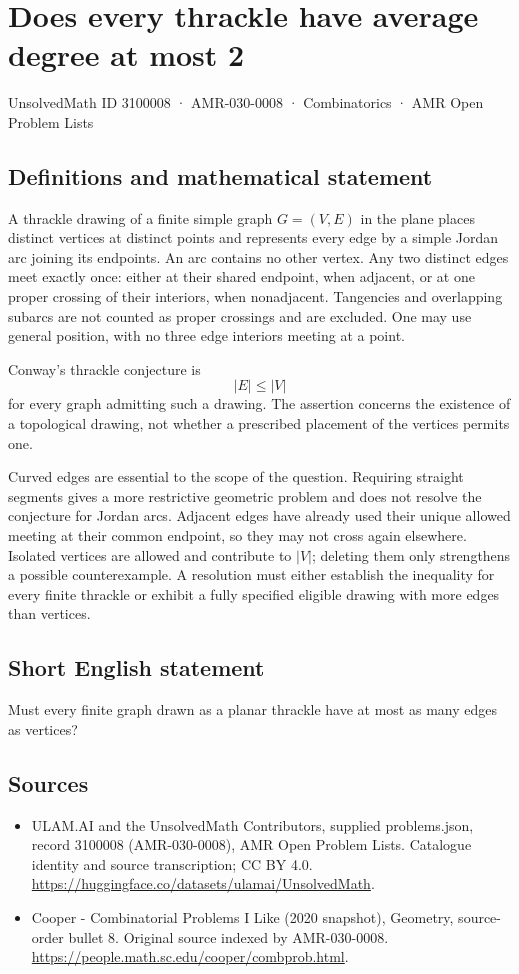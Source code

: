 \documentclass[11pt,a4paper]{article}
\begin{document}
\section*{Does every thrackle have average degree at most 2}\label{3100008}
{\small UnsolvedMath ID 3100008 · AMR-030-0008 · Combinatorics · AMR Open Problem Lists}
\subsection{Definitions and mathematical statement}
A thrackle drawing of a finite simple graph $G=(V,E)$ in the plane
places distinct vertices at distinct points and represents every
edge by a simple Jordan arc joining its endpoints. An arc contains
no other vertex. Any two distinct edges meet exactly once: either
at their shared endpoint, when adjacent, or at one proper crossing
of their interiors, when nonadjacent. Tangencies and overlapping
subarcs are not counted as proper crossings and are excluded.
One may use general position, with no three edge interiors meeting
at a point.

Conway's thrackle conjecture is
\[
                           |E|\le |V|
\]
for every graph admitting such a drawing. The assertion concerns
the existence of a topological drawing, not whether a prescribed
placement of the vertices permits one.

Curved edges are essential to the scope of the question. Requiring
straight segments gives a more restrictive geometric problem and
does not resolve the conjecture for Jordan arcs. Adjacent edges
have already used their unique allowed meeting at their common
endpoint, so they may not cross again elsewhere. Isolated vertices
are allowed and contribute to $|V|$; deleting them only strengthens
a possible counterexample. A resolution must either establish the
inequality for every finite thrackle or exhibit a fully specified
eligible drawing with more edges than vertices.
\subsection{Short English statement}
Must every finite graph drawn as a planar thrackle have at most as many edges as vertices?
\subsection{Sources}
\begin{itemize}
\item[S1] ULAM.AI and the UnsolvedMath Contributors, supplied problems.json, record 3100008 (AMR-030-0008), AMR Open Problem Lists. Catalogue identity and source transcription; CC BY 4.0.
\url{https://huggingface.co/datasets/ulamai/UnsolvedMath}.
\item[S2] Cooper - Combinatorial Problems I Like (2020 snapshot), Geometry, source-order bullet 8. Original source indexed by AMR-030-0008.
\url{https://people.math.sc.edu/cooper/combprob.html}.
\end{itemize}
\end{document}
